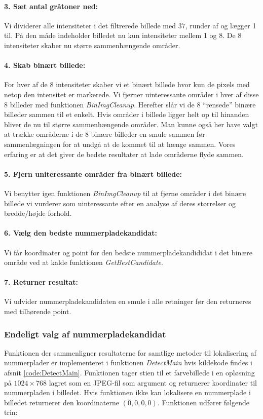 \paragraph{3. Sæt antal gråtoner ned:}
Vi dividerer alle intensiteter i det filtrerede billede med $37$, runder af og lægger 1 til. På den måde indeholder billedet nu kun intensiteter mellem 1 og 8. De 8 intensiteter skaber nu større sammenhængende områder.  

\paragraph{4. Skab binært billede:}
For hver af de 8 intensiteter skaber vi et binært billede hvor kun de pixels med netop den intensitet er markerede. Vi fjerner uinteressante områder i hver af disse 8 billeder med funktionen \textit{BinImgCleanup}. Herefter slår vi de 8 ``rensede'' binære billeder sammen til et enkelt. Hvis områder i billede ligger helt op til hinanden bliver de nu til større sammenhængende områder. Man kunne også her have valgt at trække områderne i de 8 binære billeder en smule sammen før sammenlægningen for at undgå at de kommet til at hænge sammen. Vores erfaring er at det giver de bedste resultater at lade områderne flyde sammen.   

\paragraph{5. Fjern uniteressante områder fra binært billede:}
Vi benytter igen funktionen \textit{BinImgCleanup} til at fjerne områder i det binære billede vi vurderer som uinteressante efter en analyse af deres størrelser og bredde/højde forhold.

\paragraph{6. Vælg den bedste nummerpladekandidat:}
Vi får koordinater og point for den bedste nummerpladekandididat i det binære område ved at kalde funktionen \textit{GetBestCandidate}. 

\paragraph{7. Returner resultat:}
Vi udvider nummerpladekandidaten en smule i alle retninger før den returneres med tilhørende point.

\subsubsection{Endeligt valg af nummerpladekandidat}
Funktionen der sammenligner resultaterne for samtlige metoder til lokalisering af nummerplader er implementeret i funktionen \textit{DetectMain} hvis kildekode findes i afsnit \vref{code:DetectMain}. Funktionen tager stien til et farvebillede i en opløsning på $1024 \times 768$ lagret som en JPEG-fil som argument og returnerer koordinater til nummerpladen i billedet. Hvis funktionen ikke kan lokalisere en nummerplade i billedet returnerer den koordinaterne $(0,0,0,0)$. Funktionen udfører følgende trin: 

